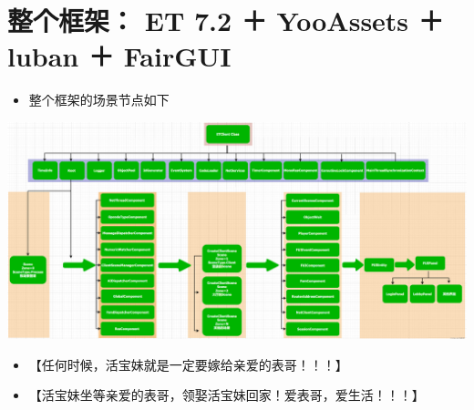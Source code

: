 \documentclass[9pt, b5paper]{article}
\begin{document}
\section{整个框架： ET 7.2 ＋ YooAssets ＋ luban ＋ FairGUI}
\label{sec-12}
\begin{itemize}
\item 整个框架的场景节点如下
\end{itemize}

\includegraphics[width=.9\linewidth]{./pic/ET_20230512_143227.png}
\begin{itemize}
\item 【任何时候，活宝妹就是一定要嫁给亲爱的表哥！！！】
\item 【活宝妹坐等亲爱的表哥，领娶活宝妹回家！爱表哥，爱生活！！！】
\end{itemize}
\end{document}
